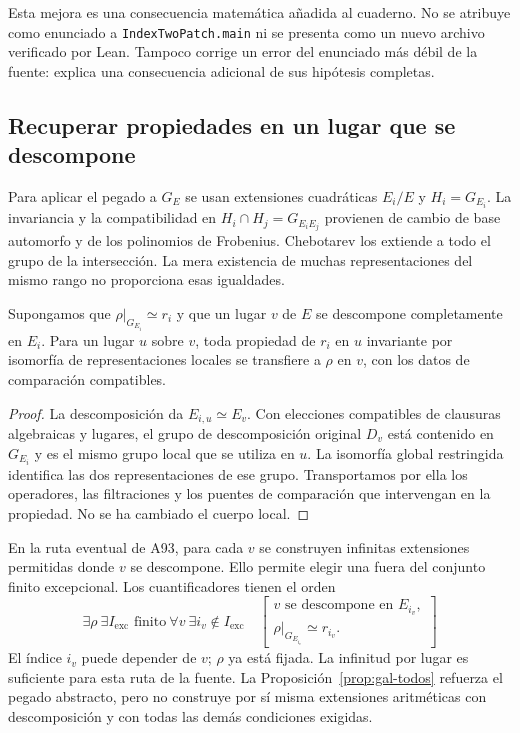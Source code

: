 Esta mejora es una consecuencia matemática añadida al cuaderno.
No se atribuye como enunciado a \texttt{IndexTwoPatch.main}
ni se presenta como un nuevo archivo verificado por Lean.
Tampoco corrige un error del enunciado más débil de la fuente:
explica una consecuencia adicional de sus hipótesis completas.

\subsection{Recuperar propiedades en un lugar que se descompone}

Para aplicar el pegado a $G_E$ se usan extensiones cuadráticas
$E_i/E$ y $H_i=G_{E_i}$. La invariancia y la compatibilidad
en $H_i\cap H_j=G_{E_iE_j}$ provienen de cambio de base
automorfo y de los polinomios de Frobenius.
Chebotarev los extiende a todo el grupo de la intersección.
La mera existencia de muchas representaciones del mismo rango
no proporciona esas igualdades.

\begin{proposicion}
\label{prop:gal-split}
Supongamos que $\rho|_{G_{E_i}}\simeq r_i$ y que un lugar $v$
de $E$ se descompone completamente en $E_i$.
Para un lugar $u$ sobre $v$, toda propiedad de $r_i$ en $u$
invariante por isomorfía de representaciones locales se
transfiere a $\rho$ en $v$, con los datos de comparación
compatibles.
\end{proposicion}

\begin{proof}
La descomposición da $E_{i,u}\simeq E_v$.
Con elecciones compatibles de clausuras algebraicas y lugares,
el grupo de descomposición original $D_v$ está contenido
en $G_{E_i}$ y es el mismo grupo local que se utiliza en $u$.
La isomorfía global restringida identifica las dos
representaciones de ese grupo.
Transportamos por ella los operadores, las filtraciones y los
puentes de comparación que intervengan en la propiedad.
No se ha cambiado el cuerpo local.
\end{proof}

En la ruta eventual de A93, para cada $v$ se construyen
infinitas extensiones permitidas donde $v$ se descompone.
Ello permite elegir una fuera del conjunto finito excepcional.
Los cuantificadores tienen el orden
\begin{equation}
 \exists\rho\ \exists I_{\mathrm{exc}}\text{ finito}\
 \forall v\ \exists i_v\notin I_{\mathrm{exc}}
 \quad
 \left[
  \begin{array}{l}
   v\text{ se descompone en }E_{i_v},\\
   \rho|_{G_{E_{i_v}}}\simeq r_{i_v}.
  \end{array}
 \right]
 \label{eq:gal-split-orden}
\end{equation}
El índice $i_v$ puede depender de $v$; $\rho$ ya está fijada.
La infinitud por lugar es suficiente para esta ruta de la fuente.
La Proposición~\ref{prop:gal-todos} refuerza el pegado abstracto,
pero no construye por sí misma extensiones aritméticas con
descomposición y con todas las demás condiciones exigidas.

